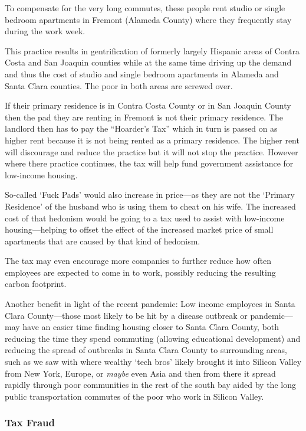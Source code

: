 To compensate for the very long commutes, these people rent studio or single bedroom apartments in Fremont (Alameda County) where they frequently stay during the work week.

This practice results in gentrification of formerly largely Hispanic areas of Contra Costa and San Joaquin counties while at the same time driving up the demand and thus the cost of studio and single bedroom apartments in Alameda and Santa Clara counties. The poor in both areas are screwed over.

If their primary residence is in Contra Costa County or in San Joaquin County then the pad they are renting in Fremont is not their primary residence. The landlord then has to pay the ``Hoarder's Tax'' which in turn is passed on as higher rent because it is not being rented as a primary residence. The higher rent will discourage and reduce the practice but it will not stop the practice. However where there practice continues, the tax will help fund government assistance for low-income housing.

So-called `Fuck Pads' would also increase in price---as they are not the `Primary Residence' of the husband who is using them to cheat on his wife. The increased cost of that hedonism would be going to a tax used to assist with low-income housing---helping to offset the effect of the increased market price of small apartments that are caused by that kind of hedonism.

The tax may even encourage more companies to further reduce how often employees are expected to come in to work, possibly reducing the resulting carbon footprint.

Another benefit in light of the recent pandemic: Low income employees in Santa Clara County---those most likely to be hit by a disease outbreak or pandemic---may have an easier time finding housing closer to Santa Clara County, both reducing the time they spend commuting (allowing educational development) and reducing the spread of outbreaks in Santa Clara County to surrounding areas, such as we saw with \sars[2]{} where wealthy `tech bros' likely brought it into Silicon Valley from New York, Europe, or \emph{maybe} even Asia and then from there it spread rapidly through poor communities in the rest of the south bay aided by the long public transportation commutes of the poor who work in Silicon Valley.

\subsubsection{Tax Fraud}

